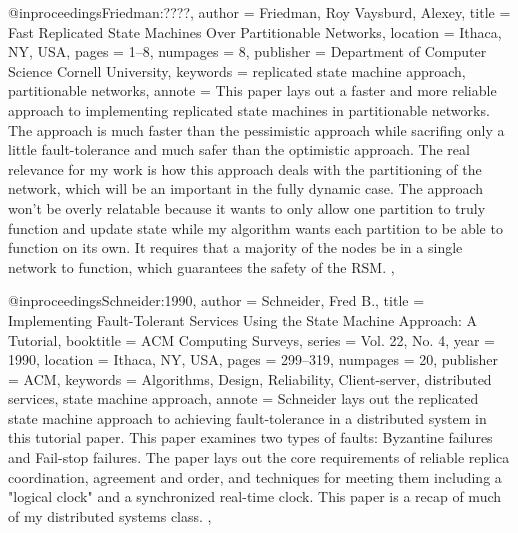 \documentclass[english]{article}
\begin{document}
@inproceedings{Friedman:????,
 author = {Friedman, Roy Vaysburd, Alexey},
 title = {Fast Replicated State Machines Over Partitionable Networks},
 location = {Ithaca, NY, USA},
 pages = {1--8},
 numpages = {8},
 publisher = {Department of Computer Science Cornell University},
 keywords = {replicated state machine approach, partitionable networks},
 annote = { This paper lays out a faster and more reliable approach to implementing replicated state machines in partitionable networks. The approach is much faster than the pessimistic approach while sacrifing only a little fault-tolerance and much safer than the optimistic approach. The real relevance for my work is how this approach deals with the partitioning of the network, which will be an important in the fully dynamic case. The approach won't be overly relatable because it wants to only allow one partition to truly function and update state while my algorithm wants each partition to be able to function on its own. It requires that a majority of the nodes be in a single network to function, which guarantees the safety of the RSM. },
}

@inproceedings{Schneider:1990,
 author = {Schneider, Fred B.},
 title = {Implementing Fault-Tolerant Services Using the State Machine Approach: A Tutorial},
 booktitle = {ACM Computing Surveys},
 series = {Vol. 22, No. 4},
 year = {1990},
 location = {Ithaca, NY, USA},
 pages = {299--319},
 numpages = {20},
 publisher = {ACM},
 keywords = {Algorithms, Design, Reliability, Client-server, distributed services, state machine approach},
 annote = { Schneider lays out the replicated state machine approach to achieving fault-tolerance in a distributed system in this tutorial paper.  This paper examines two types of faults: Byzantine failures and Fail-stop failures. The paper lays out the core requirements of reliable replica coordination, agreement and order, and techniques for meeting them including a "logical clock" and a synchronized real-time clock. This paper is a recap of much of my distributed systems class. },
}
\end{document}
